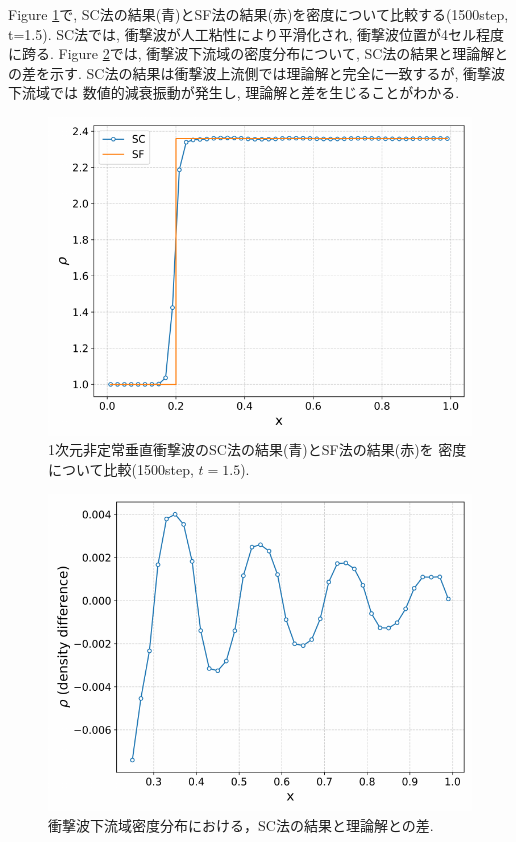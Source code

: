 \documentclass[a4j]{jarticle}
\begin{document}
Figure \ref{fig:1Dscsfa}で, SC法の結果(青)とSF法の結果(赤)を密度について比較する(1500step, t=1.5).
SC法では, 衝撃波が人工粘性により平滑化され, 衝撃波位置が4セル程度に跨る.
Figure \ref{fig:1Dscsfb}では, 衝撃波下流域の密度分布について, SC法の結果と理論解との差を示す.
SC法の結果は衝撃波上流側では理論解と完全に一致するが, 衝撃波下流域では
数値的減衰振動が発生し, 理論解と差を生じることがわかる.
\begin{figure}[h]
  \centering
  \includegraphics[width=\linewidth]{1Dscsfa.pdf}
  \caption{%
    1次元非定常垂直衝撃波のSC法の結果(青)とSF法の結果(赤)を
    密度について比較(1500step, $t=1.5$).
  }
  \label{fig:1Dscsfa}
\end{figure}

\begin{figure}[h]
  \centering
  \includegraphics[width=\linewidth]{1Dscsfb.pdf}
  \caption{%
    衝撃波下流域密度分布における，SC法の結果と理論解との差.
  }
  \label{fig:1Dscsfb}
\end{figure}
\end{document}
